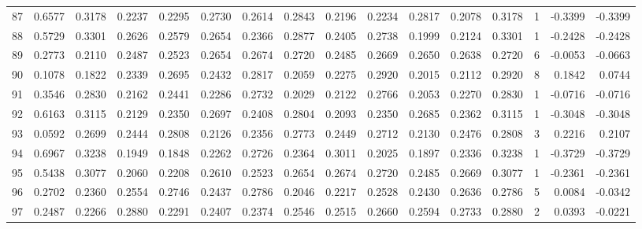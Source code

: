 \begin{tabular}{lrrrrrrrrrrrrrrr}
87  &      0.6577 &  0.3178 &  0.2237 &  0.2295 &  0.2730 &  0.2614 &  0.2843 &  0.2196 &  0.2234 &  0.2817 &   0.2078 &     0.3178 &      1 &                   -0.3399 &                    -0.3399 \\
88  &      0.5729 &  0.3301 &  0.2626 &  0.2579 &  0.2654 &  0.2366 &  0.2877 &  0.2405 &  0.2738 &  0.1999 &   0.2124 &     0.3301 &      1 &                   -0.2428 &                    -0.2428 \\
89  &      0.2773 &  0.2110 &  0.2487 &  0.2523 &  0.2654 &  0.2674 &  0.2720 &  0.2485 &  0.2669 &  0.2650 &   0.2638 &     0.2720 &      6 &                   -0.0053 &                    -0.0663 \\
90  &      0.1078 &  0.1822 &  0.2339 &  0.2695 &  0.2432 &  0.2817 &  0.2059 &  0.2275 &  0.2920 &  0.2015 &   0.2112 &     0.2920 &      8 &                    0.1842 &                     0.0744 \\
91  &      0.3546 &  0.2830 &  0.2162 &  0.2441 &  0.2286 &  0.2732 &  0.2029 &  0.2122 &  0.2766 &  0.2053 &   0.2270 &     0.2830 &      1 &                   -0.0716 &                    -0.0716 \\
92  &      0.6163 &  0.3115 &  0.2129 &  0.2350 &  0.2697 &  0.2408 &  0.2804 &  0.2093 &  0.2350 &  0.2685 &   0.2362 &     0.3115 &      1 &                   -0.3048 &                    -0.3048 \\
93  &      0.0592 &  0.2699 &  0.2444 &  0.2808 &  0.2126 &  0.2356 &  0.2773 &  0.2449 &  0.2712 &  0.2130 &   0.2476 &     0.2808 &      3 &                    0.2216 &                     0.2107 \\
94  &      0.6967 &  0.3238 &  0.1949 &  0.1848 &  0.2262 &  0.2726 &  0.2364 &  0.3011 &  0.2025 &  0.1897 &   0.2336 &     0.3238 &      1 &                   -0.3729 &                    -0.3729 \\
95  &      0.5438 &  0.3077 &  0.2060 &  0.2208 &  0.2610 &  0.2523 &  0.2654 &  0.2674 &  0.2720 &  0.2485 &   0.2669 &     0.3077 &      1 &                   -0.2361 &                    -0.2361 \\
96  &      0.2702 &  0.2360 &  0.2554 &  0.2746 &  0.2437 &  0.2786 &  0.2046 &  0.2217 &  0.2528 &  0.2430 &   0.2636 &     0.2786 &      5 &                    0.0084 &                    -0.0342 \\
97  &      0.2487 &  0.2266 &  0.2880 &  0.2291 &  0.2407 &  0.2374 &  0.2546 &  0.2515 &  0.2660 &  0.2594 &   0.2733 &     0.2880 &      2 &                    0.0393 &                    -0.0221 \\

\end{tabular}
